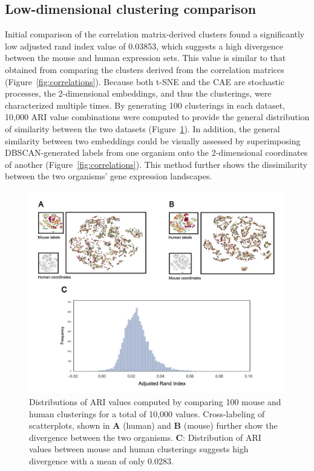 \documentclass[12pt,oneside,onecolumn,a4paper]{article}
\begin{document}
\subsection{Low-dimensional clustering comparison}

Initial comparison of the correlation matrix-derived clusters found a significantly low adjusted rand index value of 0.03853, which suggests a high divergence between the mouse and human expression sets. This value is similar to that obtained from comparing the clusters derived from the correlation matrices (Figure~\ref{fig:correlations}). Because both t-SNE and the CAE are stochastic processes, the 2-dimensional embeddings, and thus the clusterings, were characterized multiple times. By generating 100 clusterings in each dataset, 10,000 ARI value combinations were computed to provide the general distribution of similarity between the two datasets (Figure~\ref{fig:ARI_table}). In addition, the general similarity between two embeddings could be visually assessed by superimposing DBSCAN-generated labels from one organism onto the 2-dimensional coordinates of another (Figure~\ref{fig:correlations}). This method further shows the dissimilarity between the two organisms' gene expression landscapes.

\begin{figure}[H]
\begin{center}
\includegraphics[width=\columnwidth]{figures/ari_dist}
\caption{Distributions of ARI values computed by comparing 100 mouse and human clusterings for a total of 10,000 values. Cross-labeling of scatterplots, shown in \textbf{A} (human) and \textbf{B} (mouse) further show the divergence between the two organisms. \textbf{C}: Distribution of ARI values between mouse and human clusterings suggests high divergence with a mean of only 0.0283. \label{fig:ARI_table}%
}
\end{center}
\end{figure}
\end{document}
